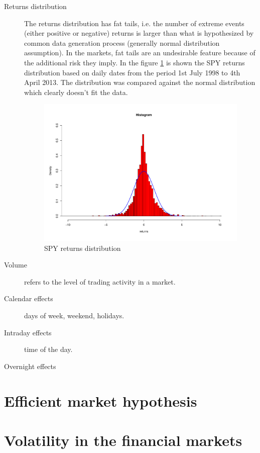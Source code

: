 \begin{description}
 \item[Returns distribution] The returns distribution has fat tails, i.e. the
 number of extreme events (either positive or negative) returns is larger than
 what is hypothesized by common data generation process (generally normal
 distribution assumption). In the markets, fat tails are an undesirable feature
 because of the additional risk they imply.  In the figure \ref{fig:returndist}
 is shown the SPY returns distribution based on daily dates from the period 1st
 July 1998 to 4th April 2013. The distribution was compared against the normal
 distribution which clearly doesn't fit the data.  
 \begin{figure}[h]
 \centering
 \includegraphics[scale=0.5]{plots/spy_returns_dist.pdf}
 \caption{SPY returns distribution}
 \label{fig:returndist}
\end{figure}
 \item[Volume] refers to the level of trading activity in a market.
 \item[Calendar effects] days of week, weekend, holidays.
 \item[Intraday effects] time of the day.
 \item[Overnight effects]
\end{description}



\section{Efficient market hypothesis}

\section{Volatility in the financial markets}


